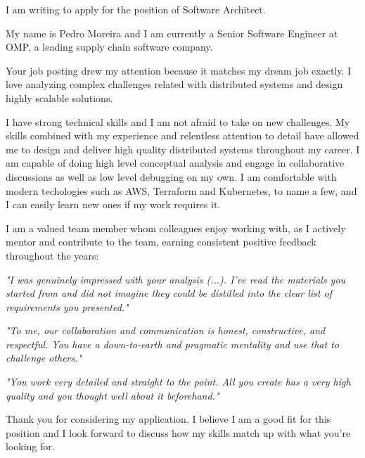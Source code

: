 I am writing to apply for the position of Software Architect.

My name is Pedro Moreira and I am currently a Senior Software Engineer at OMP, a leading supply chain software company.

Your job posting drew my attention because it matches my dream job exactly. I love analyzing complex challenges related with distributed systems and design highly scalable solutions.

I have strong technical skills and I am not afraid to take on new challenges. My skills combined with my experience and relentless attention to detail have allowed me to design and deliver high quality distributed systems throughout my career. I am capable of doing high level conceptual analysis and engage in collaborative discussions as well as low level debugging on my own. I am comfortable with modern techologies such as AWS, Terraform and Kubernetes, to name a few, and I can easily learn new ones if my work requires it.

I am a valued team member whom colleagues enjoy working with, as I actively mentor and contribute to the team, earning consistent positive feedback throughout the years:

\emph{"I was genuinely impressed with your analysis (...). I've read the materials you started from and did not imagine they could be distilled into the clear list of requirements you presented."}

\emph{"To me, our collaboration and communication is honest, constructive, and respectful. You have a down-to-earth and pragmatic mentality and use that to challenge others."}

\emph{"You work very detailed and straight to the point. All you create has a very high quality and you thought well about it beforehand."}

Thank you for considering my application. I believe I am a good fit for this position and I look forward to discuss how my skills match up with what you're looking for.
